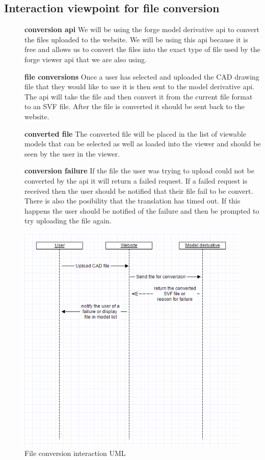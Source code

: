 \documentclass[letterpaper, 10pt, draftclsnofoot, compsoc, onecolumn]{IEEEtran}
\begin{document}
\subsection{Interaction viewpoint for file conversion}
\begin{description}
	\item[]\textbf{conversion api} We will be using the forge model derivative api to convert the files uploaded to the website. We will be using this api because it is free and allows us to convert the files into the exact type of file used by the forge viewer api that we are also using. 
	\item[]\textbf{file conversions} Once a user has selected and uploaded the CAD drawing file that they would like to use it is then sent to the model derivative api. The api will take the file and then convert it from the current file format to an SVF file. After the file is converted it should be sent back to the website.
	\item[]\textbf{converted file} The converted file will be placed in the list of viewable models that can be selected as well as loaded into the viewer and should be seen by the user in the viewer.
	\item[]\textbf{conversion failure} If the file the user was trying to upload could not be converted by the api it will return a failed request. If a failed request is received then the user should be notified that their file fail to be convert. There is also the posibility that the translation has timed out. If this happens the user should be notified of the failure and then be prompted to try uploading the file again.
\end{description}

\begin{figure}[ht]
	\includegraphics[scale=0.7]{conversionUML.png}
	\caption{File conversion interaction UML}
\end{figure}
\end{document}
